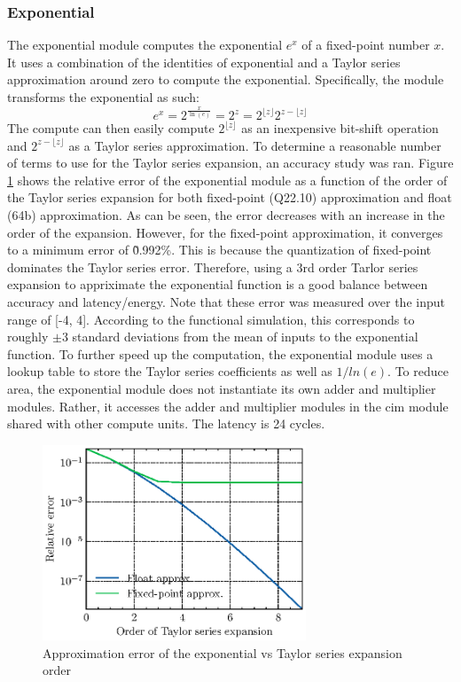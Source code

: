 \subsubsection{Exponential}
The exponential module computes the exponential $e^{x}$ of a fixed-point number $x$. It uses a combination of the identities of exponential and a Taylor series approximation around zero to
compute the exponential. Specifically, the module transforms the exponential as such:
\begin{equation}
    e^{x} = 2^{\frac{x}{\ln(e)}} = 2^{z} = 2^{\lfloor{z}\rfloor}2^{z-\lfloor{z}\rfloor}
    \label{eq:exp_transform}
\end{equation}
The compute can then easily compute $2^{\lfloor{z}\rfloor}$ as an inexpensive bit-shift operation and $2^{z-\lfloor{z}\rfloor}$ as a Taylor series approximation. To determine a reasonable
number of terms to use for the Taylor series expansion, an accuracy study was ran. Figure \ref{fig:exp_error} shows the relative error of the exponential module as a function of the order
of the Taylor series expansion for both fixed-point (Q22.10) approximation and float (64b) approximation. As can be seen, the error decreases with an increase in the order of the expansion.
However, for the fixed-point approximation, it converges to a minimum error of \~0.992\%. This is because the quantization of fixed-point dominates the Taylor series error. Therefore,
using a 3rd order Tarlor series expansion to appriximate the exponential function is a good balance between accuracy and latency/energy. Note that these error was measured over the input
range of [-4, 4]. According to the functional simulation, this corresponds to roughly $\pm3$ standard deviations from the mean of inputs to the exponential function. To further speed up the
computation, the exponential module uses a lookup table to store the Taylor series coefficients as well as $1/ln(e)$. To reduce area, the exponential module does not instantiate its own adder and
multiplier modules. Rather, it accesses the adder and multiplier modules in the \ac{cim} module shared with other compute units. The latency is 24 cycles.

\begin{figure}
    \centering
    \includegraphics[width=0.7\textwidth]{assets/exp_approx_error/exp_approx_error.eps}
    \caption{Approximation error of the exponential vs Taylor series expansion order}
    \label{fig:exp_error}
\end{figure}

